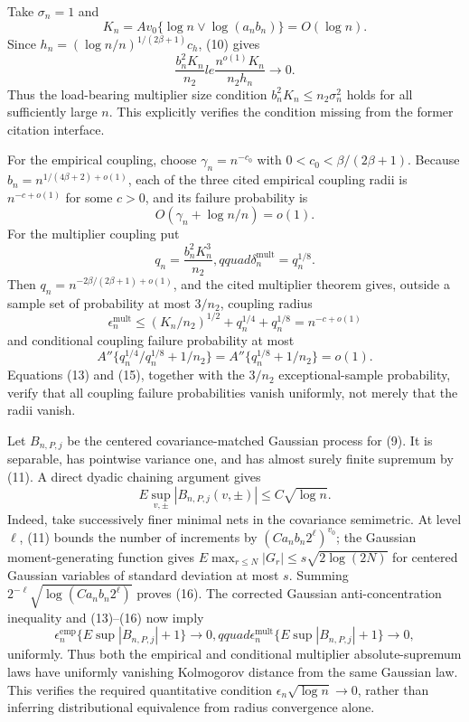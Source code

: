 Take \(\sigma_n=1\) and
\[
 K_n=A v_0\{\log n\vee\log(a_nb_n)\}=O(\log n).
\]
Since \(h_n=(\log n/n)^{1/(2\beta+1)}c_h\), (10) gives
\[
 \frac{b_n^2K_n}{n_2}le\frac{n^{o(1)}K_n}{n_2h_n}\longrightarrow0. \tag{12}
\]
Thus the load-bearing multiplier size condition \(b_n^2K_n\le n_2\sigma_n^2\) holds for all sufficiently large \(n\). This explicitly verifies the condition missing from the former citation interface.

For the empirical coupling, choose \(\gamma_n=n^{-c_0}\) with \(0<c_0<\beta/(2\beta+1)\). Because \(b_n=n^{1/(4\beta+2)+o(1)}\), each of the three cited empirical coupling radii is \(n^{-c+o(1)}\) for some \(c>0\), and its failure probability is
\[
 O(\gamma_n+\log n/n)=o(1). \tag{13}
\]
For the multiplier coupling put
\[
 q_n=\frac{b_n^2K_n^3}{n_2},qquad \delta_n^{\mathrm{mult}}=q_n^{1/8}.
\]
Then \(q_n=n^{-2\beta/(2\beta+1)+o(1)}\), and the cited multiplier theorem gives, outside a sample set of probability at most \(3/n_2\), coupling radius
\[
 \epsilon_n^{\mathrm{mult}}
 \le (K_n/n_2)^{1/2}+q_n^{1/4}+q_n^{1/8}=n^{-c+o(1)} \tag{14}
\]
and conditional coupling failure probability at most
\[
 A''\{q_n^{1/4}/q_n^{1/8}+1/n_2\}
 =A''\{q_n^{1/8}+1/n_2\}=o(1). \tag{15}
\]
Equations (13) and (15), together with the \(3/n_2\) exceptional-sample probability, verify that all coupling failure probabilities vanish uniformly, not merely that the radii vanish.

Let \(B_{n,P,j}\) be the centered covariance-matched Gaussian process for (9). It is separable, has pointwise variance one, and has almost surely finite supremum by (11). A direct dyadic chaining argument gives
\[
 E\sup_{v,\pm}|B_{n,P,j}(v,\pm)|\le C\sqrt{\log n}. \tag{16}
\]
Indeed, take successively finer minimal nets in the covariance semimetric. At level \(\ell\), (11) bounds the number of increments by \((Ca_nb_n2^\ell)^{v_0}\); the Gaussian moment-generating function gives \(E\max_{r\le N}|G_r|\le s\sqrt{2\log(2N)}\) for centered Gaussian variables of standard deviation at most \(s\). Summing \(2^{-\ell}\sqrt{\log(Ca_nb_n2^\ell)}\) proves (16). The corrected Gaussian anti-concentration inequality and (13)--(16) now imply
\[
 \epsilon_n^{\mathrm{emp}}\{E\sup|B_{n,P,j}|+1\}\to0,qquad
 \epsilon_n^{\mathrm{mult}}\{E\sup|B_{n,P,j}|+1\}\to0, \tag{17}
\]
uniformly. Thus both the empirical and conditional multiplier absolute-supremum laws have uniformly vanishing Kolmogorov distance from the same Gaussian law. This verifies the required quantitative condition \(\epsilon_n\sqrt{\log n}\to0\), rather than inferring distributional equivalence from radius convergence alone.

